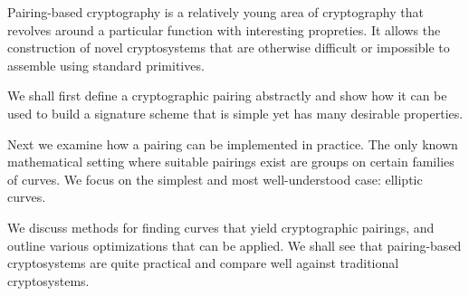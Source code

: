 \beforepreface
{}
Pairing-based cryptography is a relatively young area of cryptography that
revolves around a particular function with interesting propreties.
It allows the construction of novel cryptosystems that are otherwise
difficult or impossible to assemble using standard primitives.

We shall first define a cryptographic pairing abstractly and show how it
can be used to build a signature scheme that is simple yet has many
desirable properties.

Next we examine how a pairing can be implemented in practice. The only known
mathematical setting where suitable pairings exist are groups on certain
families of curves. We focus on the simplest and most well-understood case:
elliptic curves.

We discuss methods for finding curves that yield cryptographic pairings,
and outline various optimizations that can be applied. We shall see that
pairing-based cryptosystems are quite practical and compare well against
traditional cryptosystems.
